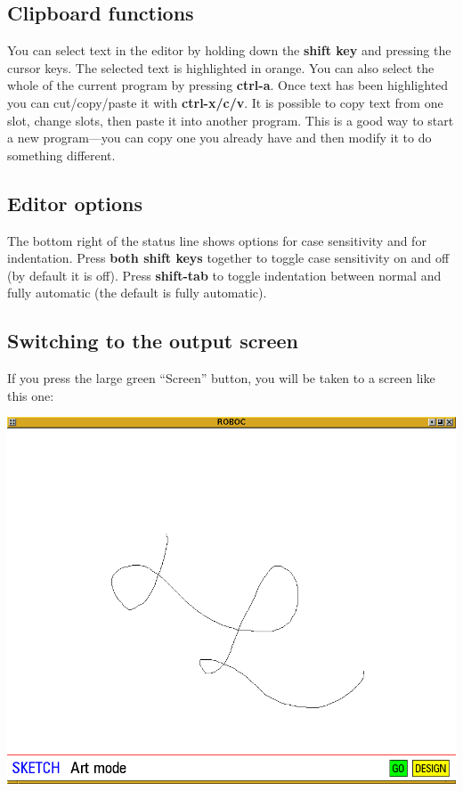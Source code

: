 \documentclass[12pt,a4paper,twoside]{article}
\renewcommand{\_}{\texttt{\symbol{95}}}
\begin{document}
\subsection{Clipboard functions}

You can select text in the editor by holding down the \textbf{shift key}
and pressing the cursor keys. The selected text is highlighted in
orange. You can also select the whole of the current program by
pressing \textbf{ctrl-a}.
Once text has been highlighted you can cut/copy/paste it with
\textbf{ctrl-x/c/v}.
It is possible to copy
text from one slot, change slots, then paste it into another program.
This is a good way to start a new program---you can copy one you
already have and then modify it to do something different.

\subsection{Editor options}

The bottom right of the status line shows options for case sensitivity
and for indentation. Press \textbf{both shift keys} together to
toggle case sensitivity on and off (by default it is off). Press
\textbf{shift-tab} to toggle indentation between normal and fully
automatic (the default is fully automatic).

\subsection{Switching to the output screen}

If you press the large green ``Screen'' button, you will
be taken to a screen like this one:

\begin{center}
\includegraphics[scale=0.6,angle=0]{screenshots/ide/art_screen}
\end{center}
\end{document}
